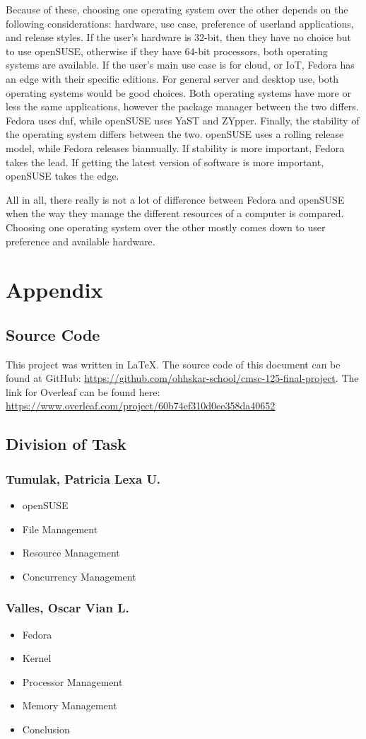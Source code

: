 \documentclass{article}
\begin{document}
Because of these, choosing one operating system over the other depends on the
following considerations: hardware, use case, preference of userland
applications, and release styles. If the user’s hardware is 32-bit, then they
have no choice but to use openSUSE, otherwise if they have 64-bit processors,
both operating systems are available. If the user’s main use case is for cloud,
or IoT, Fedora has an edge with their specific editions. For general server and
desktop use, both operating systems would be good choices. Both operating
systems have more or less the same applications, however the package manager
between the two differs. Fedora uses dnf, while openSUSE uses YaST and ZYpper.
Finally, the stability of the operating system differs between the two. openSUSE
uses a rolling release model, while Fedora releases biannually. If stability is
more important, Fedora takes the lead. If getting the latest version of software
is more important, openSUSE takes the edge.

All in all, there really is not a lot of difference between Fedora and openSUSE
when the way they manage the different resources of a computer is compared.
Choosing one operating system over the other mostly comes down to user
preference and available hardware.

\newpage
\nocite{*} \printbibliography[heading=bibintoc,title={References}]{}

\newpage
\section{Appendix}
\subsection{Source Code}
This project was written in \LaTeX{}. The source code of this document can be
found at GitHub: \url{https://github.com/ohhskar-school/cmsc-125-final-project}.
The link for Overleaf can be found here:
\url{https://www.overleaf.com/project/60b74ef310d0ee358da40652}
\subsection{Division of Task}
\subsubsection{Tumulak, Patricia Lexa U.}
\begin{itemize}
  \item{openSUSE}
  \item{File Management}
  \item{Resource Management}
  \item{Concurrency Management}
\end{itemize}
\subsubsection{Valles, Oscar Vian L.}
\begin{itemize}
  \item{Fedora}
  \item{Kernel}
  \item{Processor Management}
  \item{Memory Management}
  \item{Conclusion}
\end{itemize}
\end{document}
